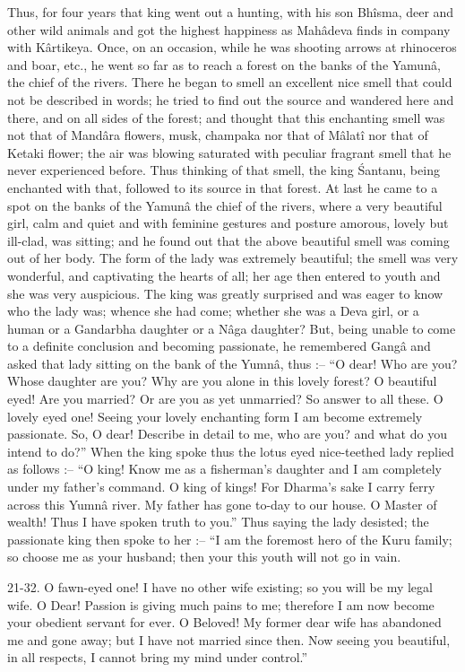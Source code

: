 Thus, for four years that king went out a hunting, with his son Bh\^isma, deer and other wild animals and got the highest happiness as Mah\^adeva finds in company with K\^artikeya. Once, on an occasion, while he was shooting arrows at rhinoceros and boar, etc., he went so far as to reach a forest on the banks of the Yamun\^a, the chief of the rivers. There he began to smell an excellent nice smell that could not be described in words; he tried to find out the source and wandered here and there, and on all sides of the forest; and thought that this enchanting smell was not that of Mand\^ara flowers, musk, champaka nor that of M\^alat\^i nor that of Ketaki flower; the air was blowing saturated with peculiar fragrant smell that he never experienced before. Thus thinking of that smell, the king \'Santanu, being enchanted with that, followed to its source in that forest. At last he came to a spot on the banks of the Yamun\^a the chief of the rivers, where a very beautiful girl, calm and quiet and with feminine gestures and posture amorous, lovely but ill-clad, was sitting; and he found out that the above beautiful smell was coming out of her body. The form of the lady was extremely beautiful; the smell was very wonderful, and captivating the hearts of all; her age then entered to youth and she was very auspicious. The king was greatly surprised and was eager to know who the lady was; whence she had come; whether she was a Deva girl, or a human or a Gandarbha daughter or a N\^aga daughter? But, being unable to come to a definite conclusion and becoming passionate, he remembered Gang\^a and asked that lady sitting on the bank of the Yumn\^a, thus :-- ``O dear! Who are you? Whose daughter are you? Why are you alone in this lovely forest? O beautiful eyed! Are you married? Or are you as yet unmarried? So answer to all these. O lovely eyed one!  Seeing your lovely enchanting form I am become extremely passionate. So, O dear! Describe in detail to me, who are you? and what do you intend to do?'' When the king spoke thus the lotus eyed nice-teethed lady replied as follows :-- ``O king! Know me as a fisherman's daughter and I am completely under my father's command. O king of kings! For Dharma's sake I carry ferry across this Yumn\^a river. My father has gone to-day to our house. O Master of wealth! Thus I have spoken truth to you.'' Thus saying the lady desisted; the passionate king then spoke to her :-- ``I am the foremost hero of the Kuru family; so choose me as your husband; then your this youth will not go in vain.

21-32. O fawn-eyed one! I have no other wife existing; so you will be my legal wife. O Dear! Passion is giving much pains to me; therefore I am now become your obedient servant for ever. O Beloved! My former dear wife has abandoned me and gone away; but I have not married since then. Now seeing you beautiful, in all respects, I cannot bring my mind under control.''

